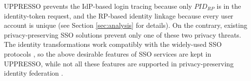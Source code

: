 UPPRESSO prevents the IdP-based login tracing because only $PID_{RP}$ is in the identity-token request,
    and the RP-based identity linkage because every user account is unique
    (see Section \ref{sec:analysis} for details).
On the contrary,
     existing privacy-preserving SSO solutions \cite{BrowserID,SPRESSO,NIST2017draft,FirefoxAccount} prevent only one of these two privacy threats.
The identity transformations work compatibly with
    the widely-used SSO protocols \cite{OpenIDConnect,rfc6749,SAML,NIST2017draft},
    so the above desirable features of SSO services are kept in UPPRESSO,
    while not all these features are supported in privacy-preserving identity federation \cite{PseudoID,ELPASSO,UnlimitID,Opaak,uprov,hyperledge-idemix}.
%
%
